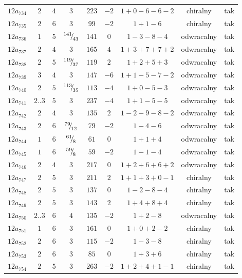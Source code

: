 \begin{longtable}{ccccccccc}
$12a_{734}$ & $2$ & $4$ & $3$ & $223$ & $-2$ & $1+0-6-6-2$ & chiralny & tak \\
$12a_{735}$ & $2$ & $6$ & $3$ & $99$ & $-2$ & $1+1-6$ & chiralny & tak \\
$12a_{736}$ & $1$ & $5$ & ${}^{141}{\mskip -5mu/\mskip -3mu}_{43}$ & $141$ & $0$ & $1-3-8-4$ & odwracalny & tak \\
$12a_{737}$ & $2$ & $4$ & $3$ & $165$ & $4$ & $1+3+7+7+2$ & odwracalny & tak \\
$12a_{738}$ & $2$ & $5$ & ${}^{119}{\mskip -5mu/\mskip -3mu}_{37}$ & $119$ & $2$ & $1+2+5+3$ & odwracalny & tak \\
$12a_{739}$ & $3$ & $4$ & $3$ & $147$ & $-6$ & $1+1-5-7-2$ & odwracalny & tak \\
$12a_{740}$ & $2$ & $5$ & ${}^{113}{\mskip -5mu/\mskip -3mu}_{35}$ & $113$ & $-4$ & $1+0-5-3$ & odwracalny & tak \\
$12a_{741}$ & $2..3$ & $5$ & $3$ & $237$ & $-4$ & $1+1-5-5$ & odwracalny & tak \\
$12a_{742}$ & $2$ & $4$ & $3$ & $135$ & $2$ & $1-2-9-8-2$ & odwracalny & tak \\
$12a_{743}$ & $2$ & $6$ & ${}^{79}{\mskip -5mu/\mskip -3mu}_{12}$ & $79$ & $-2$ & $1-4-6$ & odwracalny & tak \\
$12a_{744}$ & $1$ & $6$ & ${}^{61}{\mskip -5mu/\mskip -3mu}_{8}$ & $61$ & $0$ & $1+1+4$ & odwracalny & tak \\
$12a_{745}$ & $1$ & $6$ & ${}^{59}{\mskip -5mu/\mskip -3mu}_{8}$ & $59$ & $-2$ & $1-1-4$ & odwracalny & tak \\
$12a_{746}$ & $2$ & $4$ & $3$ & $217$ & $0$ & $1+2+6+6+2$ & odwracalny & tak \\
$12a_{747}$ & $2$ & $5$ & $3$ & $211$ & $2$ & $1+1+3+0-1$ & chiralny & tak \\
$12a_{748}$ & $2$ & $5$ & $3$ & $137$ & $0$ & $1-2-8-4$ & chiralny & tak \\
$12a_{749}$ & $2$ & $5$ & $3$ & $143$ & $2$ & $1+4+8+4$ & chiralny & tak \\
$12a_{750}$ & $2..3$ & $6$ & $4$ & $135$ & $-2$ & $1+2-8$ & odwracalny & tak \\
$12a_{751}$ & $1$ & $6$ & $3$ & $161$ & $0$ & $1+0+2-2$ & chiralny & tak \\
$12a_{752}$ & $2$ & $6$ & $3$ & $115$ & $-2$ & $1-3-8$ & chiralny & tak \\
$12a_{753}$ & $2$ & $6$ & $3$ & $85$ & $0$ & $1+3+6$ & chiralny & tak \\
$12a_{754}$ & $2$ & $5$ & $3$ & $263$ & $-2$ & $1+2+4+1-1$ & chiralny & tak \\

\end{longtable}
